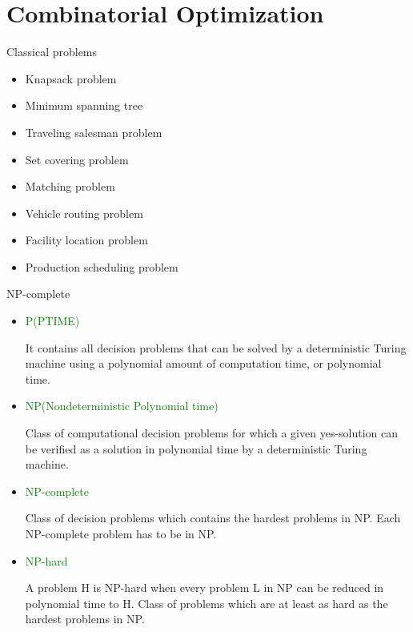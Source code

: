 \section{Combinatorial Optimization}

    \frame{\sectionpage}

    \begin{frame}{Classical problems}
      \large
      \begin{spacing}{1.5}
      \begin{itemize}
        \item Knapsack problem
        \item Minimum spanning tree
        \item Traveling salesman problem
        \item Set covering problem
        \item Matching problem
        \item Vehicle routing problem
        \item Facility location problem
        \item Production scheduling problem
      \end{itemize}
      \end{spacing}
   \end{frame}

   \begin{frame}{NP-complete}
     \begin{itemize}
       \item \textcolor{green}{P(PTIME)}

       It contains all decision problems that can be solved by a deterministic Turing machine using a polynomial amount of computation time, or polynomial time.
       \item \textcolor{green}{NP(Nondeterministic Polynomial time)}

       Class of computational decision problems for which a given yes-solution can be verified as a solution in polynomial time by a deterministic Turing machine.
       \item \textcolor{green}{NP-complete}

       Class of decision problems which contains the hardest problems in NP. Each NP-complete problem has to be in NP.
       \item \textcolor{green}{NP-hard}

       A problem H is NP-hard when every problem L in NP can be reduced in polynomial time to H.
       Class of problems which are at least as hard as the hardest problems in NP.
     \end{itemize}

   \end{frame}

